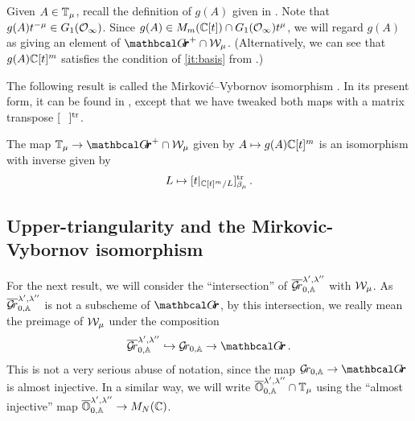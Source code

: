 \documentclass{article}
\begin{document}
Given $ A \in \mathbb T_\mu$, recall the definition of $ g(A)$ given in .  Note that $g(A)t^{-\mu} \in G_1(\mathcal O_\infty)$.
Since $ g(A) \in M_m(\mathbb C[t]) \cap G_1(\mathcal O_\infty)t^\mu$, we will regard $ g(A)$ as giving an element of $ \Grth^+ \cap \cW_\mu$.  (Alternatively, we can see that $ g(A) \mathbb C[t]^m$ satisfies the condition of \cref{it:basis} from .)

The following result is called the Mirkovi\'c--Vybornov isomorphism \cite{mirkovic2007quiver}.  In its present form, it can be found in \cite[Theorem 3.2]{cautis2018categorical}, except that we have tweaked both maps with a matrix transpose $[\phantom{A}]^{\mathrm{tr}}$.
% 

\begin{theorem}\label{th:TmuWmu}
The map $ \TT_\mu \rightarrow \Grth^+ \cap \cW_\mu $ given by $ A \mapsto g(A)\mathbb C[t]^m $ is an isomorphism with inverse given by
$$ 
    L \mapsto [t|_{\mathbb C[t]^m/L} ]^{\mathrm{tr}}_{\beta_\mu} \,. 
$$
\end{theorem}

\subsection{Upper-triangularity and the Mirkovic-Vybornov isomorphism}\label{ss:upmvy}
% 
For the next result, we will consider the ``intersection'' of $ \overline{\mathcal{G}\!r}^{\lambda', \lambda''}_{0,\mathbb A} $ with $\mathcal W_\mu$. As $  \overline{\mathcal{G}\!r}^{\lambda', \lambda''}_{0,\mathbb A} $ is not a subscheme of $ \Grth$, by this intersection, we really mean the preimage of $ \mathcal W_\mu$ under the composition
$$ 
    \overline{\Gr}^{\lambda', \lambda''}_{0,\AA}  \hookrightarrow \Grbd \rightarrow \Grth\,.
$$
This is not a very serious abuse of notation, since the map $ \Grbd \rightarrow \Grth $ is almost injective. In a similar way, we will write $ \overline{\mathbb O}^{\lambda', \lambda''}_{0,\mathbb A} \cap \mathbb T_\mu$ using the ``almost injective'' map $ \overline{\mathbb O}^{\lambda', \lambda''}_{0,\mathbb A} \rightarrow M_N(\mathbb C)$. 
\end{document}
